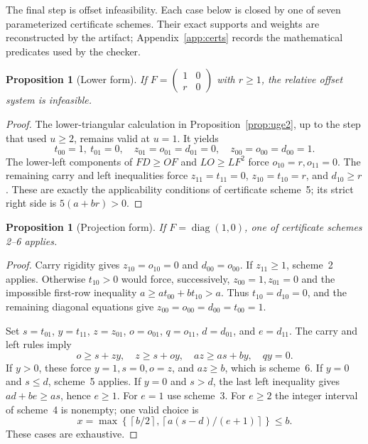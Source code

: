 \documentclass[11pt]{article}
\newtheorem{proposition}[theorem]{Proposition}
\theoremstyle{definition}
\newcommand{\mat}[4]{\begin{pmatrix}#1&#2\\#3&#4\end{pmatrix}}
\begin{document}
The final step is offset infeasibility.  Each case below is closed by one
of seven parameterized certificate schemes.  Their exact supports and
weights are reconstructed by the artifact; Appendix~\ref{app:certs}
records the mathematical predicates used by the checker.

\begin{proposition}[Lower form]\label{prop:lower}
If $F=\mat{1}{0}{r}{0}$ with $r\ge1$, the relative offset system is
infeasible.
\end{proposition}

\begin{proof}
The lower-triangular calculation in Proposition~\ref{prop:uge2}, up to the
step that used $u\ge2$, remains valid at $u=1$.  It yields
\[
 t_{00}=1,\ t_{01}=0,\quad
 z_{01}=o_{01}=d_{01}=0,\quad z_{00}=o_{00}=d_{00}=1.
\]
The lower-left components of $FD\ge OF$ and $LO\ge LF^2$ force
$o_{10}=r,o_{11}=0$.  The remaining carry and left inequalities force
$z_{11}=t_{11}=0$, $z_{10}=t_{10}=r$, and $d_{10}\ge r$.  These are
exactly the applicability conditions of certificate scheme~5; its strict
right side is $5(a+br)>0$.
\end{proof}

\begin{proposition}[Projection form]\label{prop:projection}
If $F=\operatorname{diag}(1,0)$, one of certificate schemes 2--6 applies.
\end{proposition}

\begin{proof}
Carry rigidity gives $z_{10}=o_{10}=0$ and $d_{00}=o_{00}$.  If
$z_{11}\ge1$, scheme~2 applies.  Otherwise $t_{10}>0$ would force,
successively, $z_{00}=1,z_{01}=0$ and the impossible first-row inequality
$a\ge at_{00}+bt_{10}>a$.  Thus $t_{10}=d_{10}=0$, and the remaining
diagonal equations give $z_{00}=o_{00}=d_{00}=t_{00}=1$.

Set $s=t_{01}$, $y=t_{11}$, $z=z_{01}$, $o=o_{01}$,
$q=o_{11}$, $d=d_{01}$, and $e=d_{11}$.  The carry and left rules imply
\[
 o\ge s+zy,\quad z\ge s+oy,\quad az\ge as+by,\quad qy=0.
\]
If $y>0$, these force $y=1,s=0,o=z$, and $az\ge b$, which is scheme~6.
If $y=0$ and $s\le d$, scheme~5 applies.  If $y=0$ and $s>d$, the last
left inequality gives $ad+be\ge as$, hence $e\ge1$.  For $e=1$ use
scheme~3.  For $e\ge2$ the integer interval of scheme~4 is nonempty; one
valid choice is
\[
 x=\max\left\{\left\lceil b/2\right\rceil,
 \left\lceil a(s-d)/(e+1)\right\rceil\right\}\le b.
\]
These cases are exhaustive.
\end{proof}
\end{document}
